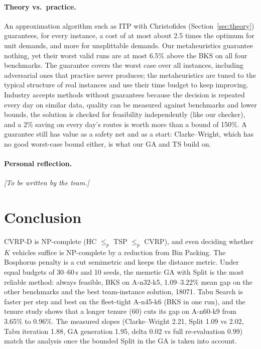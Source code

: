 \documentclass[11pt,a4paper]{article}
\theoremstyle{definition}
\theoremstyle{remark}
\begin{document}
\paragraph{Theory vs.\ practice.} An approximation algorithm such as ITP with Christofides
(Section~\ref{sec:theory}) guarantees, for every instance, a cost of at most about 2.5
times the optimum for unit demands, and more for unsplittable demands. Our metaheuristics
guarantee nothing, yet their worst valid runs are at most 6.5\% above the BKS on all
four benchmarks. The guarantee covers the worst case over all instances, including
adversarial ones that practice never produces; the metaheuristics are tuned to the
typical structure of real instances and use their time budget to keep improving. Industry
accepts methods without guarantees because the decision is repeated every day on similar
data, quality can be measured against benchmarks and lower bounds, the solution is checked
for feasibility independently (like our checker), and a 2\% saving on every day's routes is
worth more than a bound of 150\%. A guarantee still has value as a safety net and as a
start: Clarke--Wright, which has no good worst-case bound either, is what our GA and TS
build on.

\paragraph{Personal reflection.}
\emph{[To be written by the team.]}

\section{Conclusion}
CVRP-D is NP-complete (HC $\le_p$ TSP $\le_p$ CVRP), and even deciding whether $K$
vehicles suffice is NP-complete by a reduction from Bin Packing. The Bosphorus penalty is a
cut semimetric and keeps the distance metric. Under equal budgets of 30--60\,s and 10 seeds,
the memetic GA with Split is the most reliable method: always feasible, BKS on A-n32-k5,
1.09--3.22\% mean gap on the other benchmarks and the best team-instance solution, 18071.
Tabu Search is faster per step and best on the fleet-tight A-n45-k6 (BKS in one run), and
the tenure study shows that a longer tenure (60) cuts its gap on A-n60-k9 from 3.65\% to
0.96\%. The measured slopes (Clarke--Wright 2.21, Split 1.09 vs 2.02, Tabu iteration 1.88,
GA generation 1.95, delta 0.02 vs full re-evaluation 0.99) match the analysis once the
bounded Split in the GA is taken into account.
\end{document}
